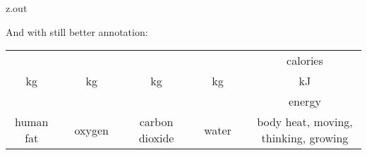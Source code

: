 \begin{VerbatimOut}{z.out}

And with still better annotation:

\begin{center}
  \newcommand{\Fs}{\scriptsize}
  \begin{tabular}{@{}c@{}c@{}c@{}c@{}c@{}c@{}c@{}c@{}c@{}}
    &                                                       %
      &                                                     %
      &                                                     %
      &                                                     %
      &                                                     %
      &                                                     %
      &                                                     %
      &                                                     %
      \Fs calories\\                                        %
    \Fs kg&                                                 %
      &                                                     %
      \Fs kg&                                               %
      &                                                     %
      \Fs kg&                                               %
      &                                                     %
      \Fs kg&                                               %
      &                                                     %
      \Fs kJ\\                                              %
    \noalign{\vspace{3pt}}
    \ce{C55H104O6}                                          %
      & \ce{+}                                              %
      & \ce{78O2}                                           %
      & \ce{->}                                             %
      & \ce{55CO2}                                          %
      & \ce{+}                                              %
      & \ce{52H2O}                                          %
      & \ce{+}                                              %
      & energy\\                                            %
    \Fs human fat&                                          %
      &                                                     %
      \Fs oxygen&                                           %
      &                                                     %
      \Fs carbon dioxide&                                   %
      &                                                     %
      \Fs water&                                            %
      &                                                     %
      \Fs body heat, moving, thinking, growing\\            %
  \end{tabular}
\end{center}
\end{VerbatimOut}

